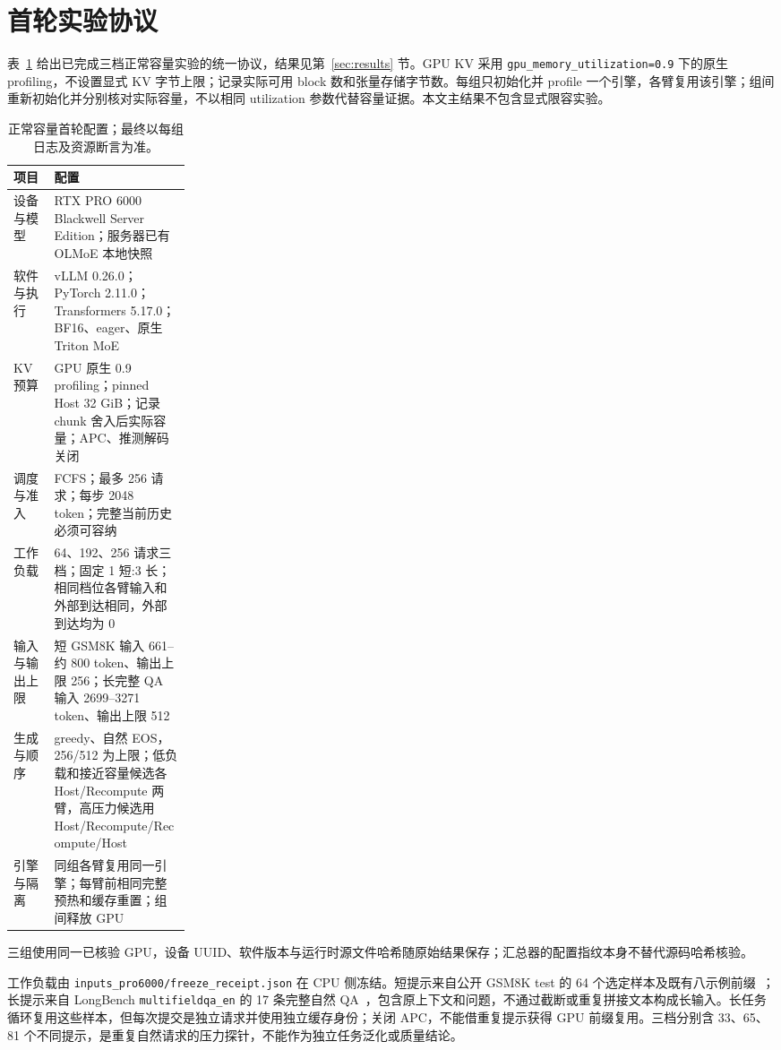\documentclass[UTF8,fontset=fandol,a4paper,10pt]{ctexart}
\newcommand{\code}[1]{\nolinkurl{#1}}
\begin{document}
\section{首轮实验协议}
\label{sec:protocol}
表~\ref{tab:config} 给出已完成三档正常容量实验的统一协议，结果见第~\ref{sec:results} 节。GPU KV 采用 \code{gpu_memory_utilization=0.9} 下的原生 profiling，不设置显式 KV 字节上限；记录实际可用 block 数和张量存储字节数。每组只初始化并 profile 一个引擎，各臂复用该引擎；组间重新初始化并分别核对实际容量，不以相同 utilization 参数代替容量证据。本文主结果不包含显式限容实验。
\begin{table}[ht]
\centering\small
\caption{正常容量首轮配置；最终以每组日志及资源断言为准。}
\label{tab:config}
\begin{tabularx}{\linewidth}{@{}p{0.23\linewidth}X@{}}
\toprule
项目 & 配置 \\
\midrule
设备与模型 & RTX PRO 6000 Blackwell Server Edition；服务器已有 OLMoE 本地快照 \\
软件与执行 & vLLM 0.26.0；PyTorch 2.11.0；Transformers 5.17.0；BF16、eager、原生 Triton MoE \\
KV 预算 & GPU 原生 0.9 profiling；pinned Host 32 GiB；记录 chunk 舍入后实际容量；APC、推测解码关闭 \\
调度与准入 & FCFS；最多 256 请求；每步 2048 token；完整当前历史必须可容纳 \\
工作负载 & 64、192、256 请求三档；固定 1 短:3 长；相同档位各臂输入和外部到达相同，外部到达均为 0 \\
输入与输出上限 & 短 GSM8K 输入 661--约 800 token、输出上限 256；长完整 QA 输入 2699--3271 token、输出上限 512 \\
生成与顺序 & greedy、自然 EOS，256/512 为上限；低负载和接近容量候选各 Host/Recompute 两臂，高压力候选用 Host/Recompute/Recompute/Host \\
引擎与隔离 & 同组各臂复用同一引擎；每臂前相同完整预热和缓存重置；组间释放 GPU \\
\bottomrule
\end{tabularx}
\end{table}

三组使用同一已核验 GPU，设备 UUID、软件版本与运行时源文件哈希随原始结果保存；汇总器的配置指纹本身不替代源码哈希核验。

工作负载由 \code{inputs_pro6000/freeze_receipt.json} 在 CPU 侧冻结。短提示来自公开 GSM8K test 的 64 个选定样本及既有八示例前缀~\cite{gsm8k}；长提示来自 LongBench \code{multifieldqa_en} 的 17 条完整自然 QA~\cite{longbench}，包含原上下文和问题，不通过截断或重复拼接文本构成长输入。长任务循环复用这些样本，但每次提交是独立请求并使用独立缓存身份；关闭 APC，不能借重复提示获得 GPU 前缀复用。三档分别含 33、65、81 个不同提示，是重复自然请求的压力探针，不能作为独立任务泛化或质量结论。
\end{document}
